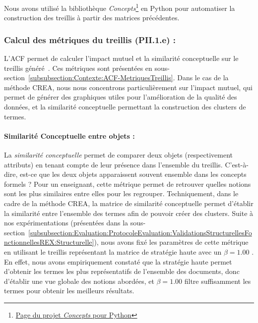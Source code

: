 Nous avons utilisé la bibliothèque \textit{Concepts}\footnote{ \href{https://concepts.readthedocs.io/en/stable/}{Page du projet \textit{Concepts} pour Python} } en Python pour automatiser la construction des treillis à partir des matrices précédentes.


\subsubsection{Calcul des métriques du treillis (PII.1.e) :}
\label{subsubsection:CREA:PII.1.e-metriquestreillis}

L'ACF permet de calculer l'impact mutuel et la similarité conceptuelle sur le treillis généré~\cite{jaffal2019aide}.
Ces métriques sont présentées en sous-section~\ref{subsubsection:Contexte:ACF-MetriquesTreillis}.
Dans le cas de la méthode CREA, nous nous concentrons particulièrement sur l'impact mutuel, qui permet de générer des graphiques utiles pour l'amélioration de la qualité des données, et la similarité conceptuelle permettant la construction des clusters de termes.


\paragraph{Similarité Conceptuelle entre objets :}
\label{mystep:CREA:PII.1.e-metrique-similariteobjets}

La \textit{similarité conceptuelle} permet de comparer deux objets (respectivement attributs) en tenant compte de leur présence dans l'ensemble du treillis.
C'est-à-dire, est-ce que les deux objets apparaissent souvent ensemble dans les concepts formels ?
Pour un enseignant, cette métrique permet de retrouver quelles notions sont les plus similaires entre elles pour les regrouper.
Techniquement, dans le cadre de la méthode CREA, la matrice de similarité conceptuelle permet d'établir la similarité entre l'ensemble des termes afin de pouvoir créer des clusters.
Suite à nos expérimentations (présentées dans la sous-section~\ref{subsubsection:Evaluation:ProtocoleEvaluation:ValidationsStructurellesFonctionnellesREX:Structurelle}), nous avons fixé les paramètres de cette métrique en utilisant le treillis représentant la matrice de stratégie haute avec un $ \beta = 1.00 $ .
En effet, nous avons empiriquement constaté que la stratégie haute permet d'obtenir les termes les plus représentatifs de l'ensemble des documents, donc d'établir une vue globale des notions abordées, et $ \beta = 1.00 $ filtre suffisamment les termes pour obtenir les meilleurs résultats.



